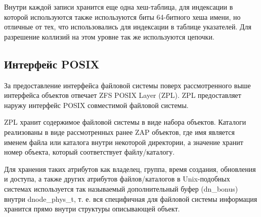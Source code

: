 Внутри каждой записи хранится еще одна хеш-таблица, для индексации в которой
используются также используются биты 64-битного хеша имени, но отличные от тех,
что использовались для индексации в таблице указателей. Для разрешение коллизий
на этом уровне так же используются цепочки.

\subsection{Интерфейс POSIX}

За предоставление интерфейса файловой системы поверх рассмотренного выше
интерфейса объектов отвечает ZFS POSIX Layer (ZPL). ZPL предоставляет наружу
интерфейс POSIX совместимой файловой системы.

ZPL хранит содержимое файловой системы в виде набора объектов. Каталоги
реализованы в виде рассмотренных ранее ZAP объектов, где имя является именем
файла или каталога внутри некоторой директории, а значение хранит номер объекта,
который соответствует файлу/каталогу.

Для хранения таких атрибутов как владелец, группа, время создания, обновления и
доступа, а также других атрибутов файлов/каталогов в Unix-подобных системах
используется так называемый дополнительный буфер (dn\_bonus) внутри
dnode\_phys\_t, т. е. вся специфичная для файловой системы информация хранится
прямо внутри структуры описывающей объект.
